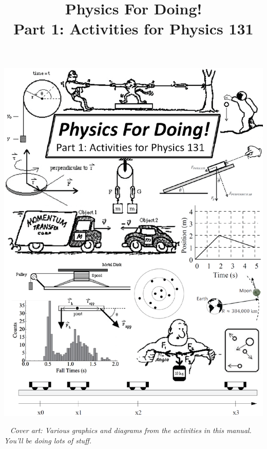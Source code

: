 \thispagestyle{empty}

\begin{center}
\includegraphics[width=7.3in,trim={0 0 .1cm 0},clip]{131_front_pages/131_front_cover.eps}
\end{center}
\newpage

\restoregeometry
\restorepagecolor
\thispagestyle{empty}

\
\vfill
\textit{Cover art: Various graphics and diagrams from the activities in this manual.  You'll be doing lots of stuff.}
\pagebreak



\title{Physics For Doing!\\
Part 1: Activities for Physics 131}

